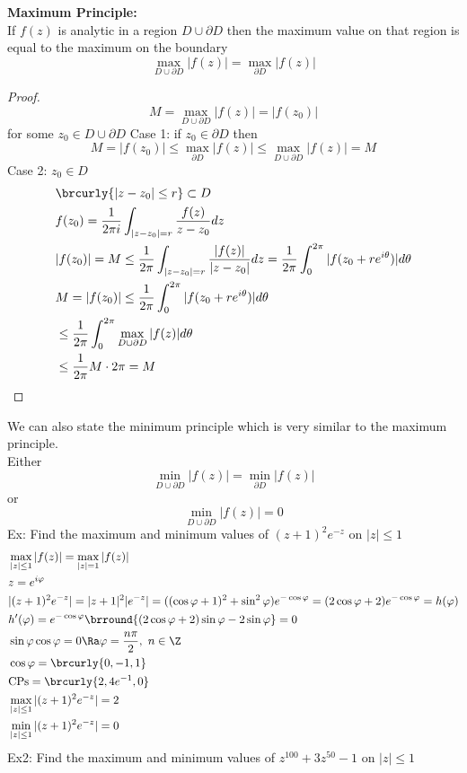 \textbf{Maximum Principle:}\\
If $f(z)$ is analytic in a region $D\cup\partial D$ then the maximum value on that region is equal to the maximum on the boundary
\[\max_{D\cup\partial D}|f(z)|=\max_{\partial D}|f(z)|\]
\begin{proof}
\[M=\max_{D\cup\partial D}|f(z)|=|f(z_0)|\]
for some $z_0\in D\cup\partial D$
Case 1: if $z_0\in\partial D$ then
\[M=|f(z_0)|\leq\max_{\partial D}|f(z)|\leq\max_{D\cup\partial D}|f(z)|=M\]
Case 2: $z_0\in D$
\begin{align*}
    &\brcurly{|z-z_0|\leq r}\subset D\\
    &f(z_0)=\frac{1}{2\pi i}\int_{|z-z_0|=r}\frac{f(z)}{z-z_0}dz\\
    &|f(z_0)|=M\leq\frac{1}{2\pi}\int_{|z-z_0|=r}\frac{|f(z)|}{|z-z_0|}dz=\frac{1}{2\pi}\int_0^{2\pi}|f(z_0+re^{i\theta})|d\theta\\
    &M=|f(z_0)|\leq\frac{1}{2\pi}\int_0^{2\pi}|f(z_0+re^{i\theta})|d\theta\\
    &\leq\frac{1}{2\pi}\int_0^{2\pi}\max_{D\cup\partial D}|f(z)|d\theta\\
    &\leq\frac{1}{2\pi}M\cdot 2\pi=M
\end{align*}
\end{proof}
We can also state the minimum principle which is very similar to the maximum principle.\\
Either 
\[\min_{D\cup\partial D}|f(z)|=\min_{\partial D}|f(z)|\]
or
\[\min_{D\cup\partial D}|f(z)|=0\]
Ex: Find the maximum and minimum values of $(z+1)^2e^{-z}$ on $|z|\leq 1$
\begin{align*}
    &\max_{|z|\leq1}|f(z)|=\max_{|z|=1}|f(z)|\\
    &z=e^{i\varphi}\\
    &|(z+1)^2e^{-z}|=|z+1|^2|e^{-z}|=((\cos \varphi+1)^2+\sin^2\varphi)e^{-\cos\varphi}=(2\cos\varphi+2)e^{-\cos\varphi}=h(\varphi)\\
    &h'(\varphi)=e^{-\cos\varphi}\brround{(2\cos\varphi+2)\sin\varphi-2\sin\varphi}=0\\
    &\sin\varphi\cos\varphi=0\Ra \varphi=\frac{n\pi}{2},\ n\in\Z\\
    &\cos\varphi=\brcurly{0,-1,1}\\
    &\mathrm{CPs}=\brcurly{2,4e^{-1},0}\\
    &\max_{|z|\leq1}|(z+1)^2e^{-z}|=2\\
    &\min_{|z|\leq1}|(z+1)^2e^{-z}|=0
\end{align*}
Ex2: Find the maximum and minimum values of $z^{100}+3z^{50}-1$ on $|z|\leq 1$

